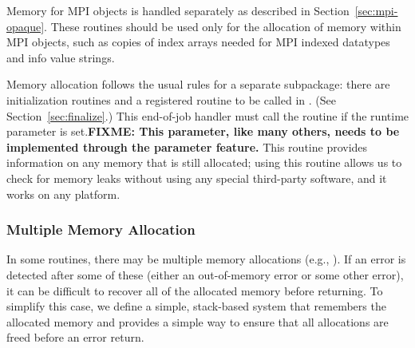 \documentclass{article}
\def\fixme#1{\marginpar{FIXME:}\textbf{FIXME: #1}}
\begin{document}
Memory for MPI objects is handled separately as described in
Section~\ref{sec:mpi-opaque}.  These routines should be used only for
the allocation of memory within MPI objects, such as copies of index
arrays needed for MPI indexed datatypes and info value strings.

Memory allocation follows the usual rules for a separate subpackage: there are
initialization routines and a registered routine to be called in
. (See Section~\ref{sec:finalize}.)  
This end-of-job
handler must call the 
routine  if the runtime parameter
 is set.\fixme{This parameter,
  like many others, needs to be implemented through the parameter
  feature.}
This routine
provides information on any memory that is still allocated; using this
routine allows us to check for memory leaks without using any special
third-party software, and it works on any platform.



\subsubsection{Multiple Memory Allocation}
In some routines, there may be multiple memory allocations (e.g.,
).  If an error is 
detected after some of these (either an out-of-memory error or some other
error), it can be difficult to recover all of the allocated memory before
returning.  To simplify this case, we define a simple, stack-based system that
remembers the allocated memory and provides a simple way to ensure that all
allocations are freed before an error return.

\end{document}
